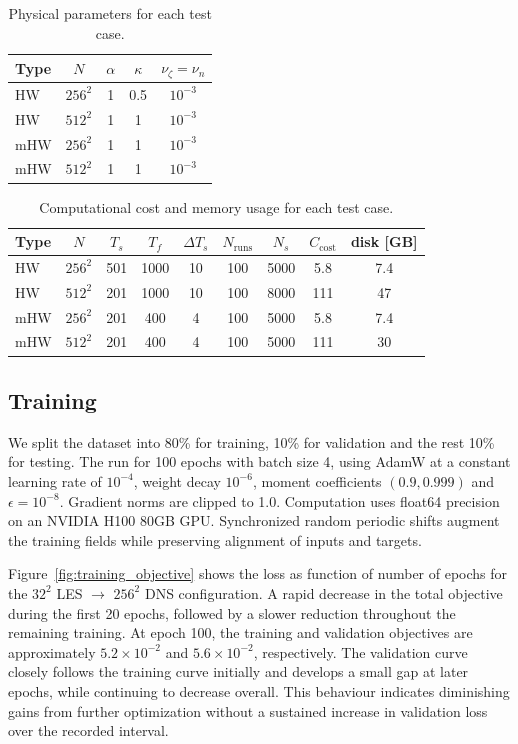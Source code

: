 \documentclass[authoryear,preprint,review,12pt]{elsarticle}
\begin{document}
\begin{table}[htbp]
\centering
\caption{Physical parameters for each test case.}
\label{tab:cases}
\begin{tabular}{l|c c c c}
\hline
Type & $N$ & $\alpha$ & $\kappa$ & $\nu_\zeta=\nu_n$ \\
\hline
HW  & $256^2$ & 1 & 0.5 & $10^{-3}$ \\
HW  & $512^2$ & 1 & 1   & $10^{-3}$ \\
mHW & $256^2$ & 1 & 1   & $10^{-3}$ \\
mHW & $512^2$ & 1 & 1   & $10^{-3}$ \\
\hline
\end{tabular}
\end{table}

\begin{table}[htbp]
\centering
\caption{Computational cost and memory usage for each test case.}
\label{tab:dataset_effort}
\begin{tabular}{l|c c c c c c c c }
\hline
Type & $N$ & $T_s$ & $T_f$ & $\Delta T_s$ & $N_{\mathrm{runs}}$ & $N_s$ & $C_{\mathrm{cost}}$ & disk [GB] \\
\hline
HW  & $256^2$ & 501 & 1000 & 10 & 100 & 5000 & 5.8 & 7.4 \\
HW  & $512^2$ & 201 & 1000 & 10 & 100 & 8000 & 111 & 47 \\
mHW & $256^2$ & 201 & 400  & 4  & 100 & 5000 & 5.8 & 7.4 \\
mHW & $512^2$ & 201 & 400  & 4  & 100 & 5000 & 111 & 30 \\
\hline
\end{tabular}
\end{table}








\subsection{Training}\label{sec:Training}
We split the dataset into 80\% for training, 10\% for validation and the rest 10\% for testing.
The run for 100 epochs with batch size 4, using AdamW at a constant learning rate of $10^{-4}$, weight decay $10^{-6}$, moment coefficients $(0.9,0.999)$ and $\epsilon=10^{-8}$. Gradient norms are clipped to 1.0. Computation uses float64 precision on an NVIDIA H100 80GB GPU. Synchronized random periodic shifts augment the training fields while preserving alignment of inputs and targets.

Figure~\ref{fig:training_objective} shows the loss as function of number of epochs for the 
$32^2$ LES $\to$ $256^2$ DNS configuration. A rapid decrease in the total objective during the first 20 epochs, followed by a slower reduction throughout the remaining training. At epoch 100, the training and validation objectives are approximately $5.2\times10^{-2}$ and $5.6\times10^{-2}$, respectively. The validation curve closely follows the training curve initially and develops a small gap at later epochs, while continuing to decrease overall. This behaviour indicates diminishing gains from further optimization without a sustained increase in validation loss over the recorded interval.
\end{document}
